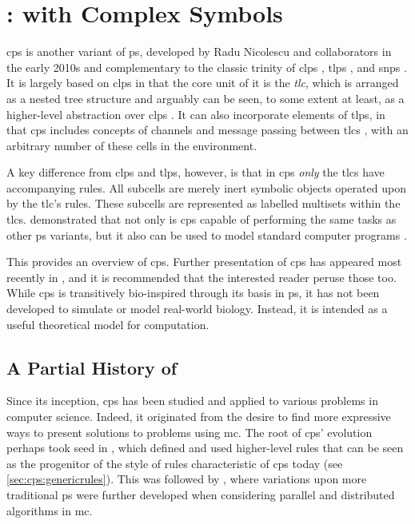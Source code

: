\chapter{\label{chap:cpsystems}:  with Complex Symbols}

\gls{cps} is another variant of \gls{ps}, developed by Radu Nicolescu and collaborators in the early 2010s and complementary to the classic trinity of \gls{clps} \cite{Paun2000}, \gls{tlps} \cite{Martin-Vide2003}, and \gls{snps} \cite{Ionescu2006}.  It is largely based on \gls{clps} in that the core unit of it is the \emph{\gls{tlc}}, which is arranged as a nested tree structure and arguably can be seen, to some extent at least, as a higher-level abstraction over \gls{clps} \cite{Nicolescu2018}.  It can also incorporate elements of \gls{tlps}, in that \gls{cps} includes concepts of channels and message passing between \glspl{tlc} \cite{Henderson2019}, with an arbitrary number of these cells in the environment.  

A key difference from \gls{clps} and \gls{tlps}, however, is that in \gls{cps} \emph{only} the \glspl{tlc} have accompanying rules.  All subcells are merely inert symbolic objects operated upon by the \gls{tlc}'s rules.  These subcells are represented as labelled multisets within the \glspl{tlc}.  \citeauthor{Nicolescu2014a} demonstrated that not only is \gls{cps} capable of performing the same tasks as other \gls{ps} variants, but it also can be used to model standard computer programs \cite{Nicolescu2014a}.

This  provides an overview of \gls{cps}.  Further presentation of \gls{cps} has appeared most recently in \cite{Nicolescu2018,Henderson2019,Henderson2020,Liu2020,Liu2021}, and it is recommended that the interested reader peruse those too.  While \gls{cps} is transitively bio-inspired through its basis in \gls{ps}, it has not been developed to simulate or model real-world biology.  Instead, it is intended as a useful theoretical model for computation.

\section{A Partial History of }

Since its inception, \gls{cps} has been studied and applied to various problems in computer science.  Indeed, it originated from the desire to find more expressive ways to present solutions to problems using \gls{mc}.  The root of \gls{cps}' evolution perhaps took seed in \cite{Balanescu2011}, which defined and used higher-level rules that can be seen as the progenitor of the style of rules characteristic of \gls{cps} today (see \vref{sec:cps:genericrules}).  This was followed by \cite{Nicolescu2012}, where variations upon more traditional \gls{ps} were further developed when considering parallel and distributed algorithms in \gls{mc}.

